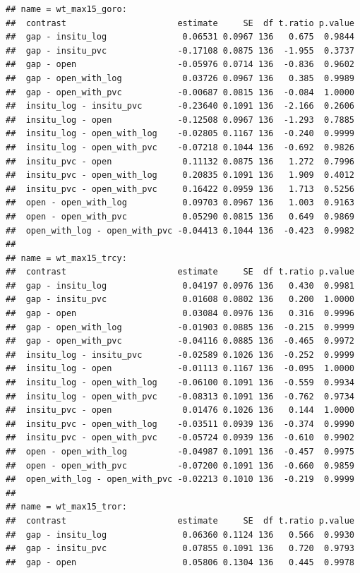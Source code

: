 \documentclass[
]{article}
\begin{document}
\begin{verbatim}
## name = wt_max15_goro:
##  contrast                      estimate     SE  df t.ratio p.value
##  gap - insitu_log               0.06531 0.0967 136   0.675  0.9844
##  gap - insitu_pvc              -0.17108 0.0875 136  -1.955  0.3737
##  gap - open                    -0.05976 0.0714 136  -0.836  0.9602
##  gap - open_with_log            0.03726 0.0967 136   0.385  0.9989
##  gap - open_with_pvc           -0.00687 0.0815 136  -0.084  1.0000
##  insitu_log - insitu_pvc       -0.23640 0.1091 136  -2.166  0.2606
##  insitu_log - open             -0.12508 0.0967 136  -1.293  0.7885
##  insitu_log - open_with_log    -0.02805 0.1167 136  -0.240  0.9999
##  insitu_log - open_with_pvc    -0.07218 0.1044 136  -0.692  0.9826
##  insitu_pvc - open              0.11132 0.0875 136   1.272  0.7996
##  insitu_pvc - open_with_log     0.20835 0.1091 136   1.909  0.4012
##  insitu_pvc - open_with_pvc     0.16422 0.0959 136   1.713  0.5256
##  open - open_with_log           0.09703 0.0967 136   1.003  0.9163
##  open - open_with_pvc           0.05290 0.0815 136   0.649  0.9869
##  open_with_log - open_with_pvc -0.04413 0.1044 136  -0.423  0.9982
## 
## name = wt_max15_trcy:
##  contrast                      estimate     SE  df t.ratio p.value
##  gap - insitu_log               0.04197 0.0976 136   0.430  0.9981
##  gap - insitu_pvc               0.01608 0.0802 136   0.200  1.0000
##  gap - open                     0.03084 0.0976 136   0.316  0.9996
##  gap - open_with_log           -0.01903 0.0885 136  -0.215  0.9999
##  gap - open_with_pvc           -0.04116 0.0885 136  -0.465  0.9972
##  insitu_log - insitu_pvc       -0.02589 0.1026 136  -0.252  0.9999
##  insitu_log - open             -0.01113 0.1167 136  -0.095  1.0000
##  insitu_log - open_with_log    -0.06100 0.1091 136  -0.559  0.9934
##  insitu_log - open_with_pvc    -0.08313 0.1091 136  -0.762  0.9734
##  insitu_pvc - open              0.01476 0.1026 136   0.144  1.0000
##  insitu_pvc - open_with_log    -0.03511 0.0939 136  -0.374  0.9990
##  insitu_pvc - open_with_pvc    -0.05724 0.0939 136  -0.610  0.9902
##  open - open_with_log          -0.04987 0.1091 136  -0.457  0.9975
##  open - open_with_pvc          -0.07200 0.1091 136  -0.660  0.9859
##  open_with_log - open_with_pvc -0.02213 0.1010 136  -0.219  0.9999
## 
## name = wt_max15_tror:
##  contrast                      estimate     SE  df t.ratio p.value
##  gap - insitu_log               0.06360 0.1124 136   0.566  0.9930
##  gap - insitu_pvc               0.07855 0.1091 136   0.720  0.9793
##  gap - open                     0.05806 0.1304 136   0.445  0.9978

\end{verbatim}
\end{document}
